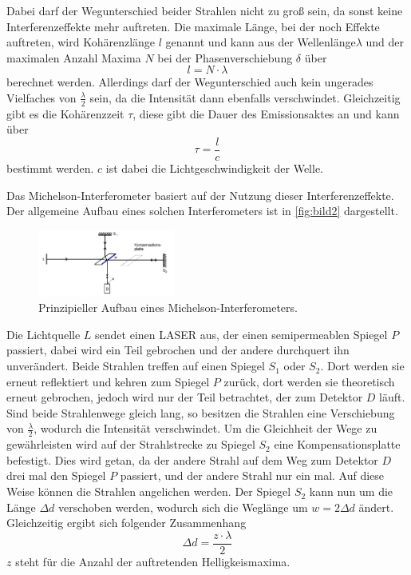 Dabei darf der Wegunterschied beider Strahlen nicht zu groß sein, da sonst keine Interferenzeffekte mehr auftreten. Die maximale Länge, bei der noch Effekte auftreten, wird Kohärenzlänge $l$ genannt und kann aus der Wellenlänge$\lambda$ und der maximalen Anzahl Maxima $N$ bei der Phasenverschiebung $\delta$ über 
\begin{equation}
    l = N \cdot \lambda
\end{equation}
berechnet werden.
Allerdings darf der Wegunterschied auch kein ungerades Vielfaches von $\frac{\lambda}{2}$ sein, da die Intensität dann ebenfalls verschwindet.
Gleichzeitig gibt es die Kohärenzzeit $\tau$, diese gibt die Dauer des Emissionsaktes an und kann über 
\begin{equation}
    \tau = \frac{l}{c}
\end{equation}
bestimmt werden. $c$ ist dabei die Lichtgeschwindigkeit der Welle.

Das Michelson-Interferometer basiert auf der Nutzung dieser Interferenzeffekte.
Der allgemeine Aufbau eines solchen Interferometers ist in \autoref{fig:bild2} dargestellt.

\begin{figure}
    \centering
    \includegraphics[width=0.4\textwidth]{images/bild2.png}
    \caption{Prinzipieller Aufbau eines Michelson-Interferometers.\cite{V401}}
    \label{fig:bild2}
\end{figure}

Die Lichtquelle $L$ sendet einen LASER aus, der einen semipermeablen Spiegel $P$ passiert, dabei wird ein Teil gebrochen und der andere durchquert ihn unverändert.
Beide Strahlen treffen auf einen Spiegel $S_\text{1}$ oder $S_\text{2}$.
Dort werden sie erneut reflektiert und kehren zum Spiegel $P$ zurück, dort werden sie theoretisch erneut gebrochen, jedoch wird nur der Teil betrachtet, der zum Detektor $D$ läuft.
Sind beide Strahlenwege gleich lang, so besitzen die Strahlen eine Verschiebung von $\frac{\lambda}{2}$, wodurch die Intensität verschwindet.
Um die Gleichheit der Wege zu gewährleisten wird auf der Strahlstrecke zu Spiegel $S_\text{2}$ eine Kompensationsplatte befestigt.
Dies wird getan, da der andere Strahl auf dem Weg zum Detektor $D$ drei mal den Spiegel $P$ passiert, und der andere Strahl nur ein mal. 
Auf diese Weise können die Strahlen angelichen werden.
Der Spiegel $S_\text{2}$ kann nun um die Länge $\Delta d$ verschoben werden, wodurch sich die Weglänge um $w = 2\Delta d$ ändert.
Gleichzeitig ergibt sich folgender Zusammenhang
\begin{equation}
    \Delta d = \frac{z \cdot \lambda}{2}
\end{equation}
$z$ steht für die Anzahl der auftretenden Helligkeismaxima.

